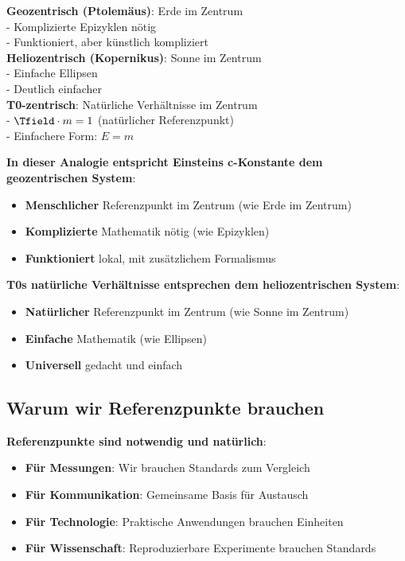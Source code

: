 	\begin{tcolorbox}[colback=blue!5!white,colframe=blue!75!black,title=Der Referenzpunktwechsel: Von Erde $\rightarrow$ Sonne $\rightarrow$ Natur]
		\textbf{Geozentrisch (Ptolemäus)}: Erde im Zentrum \\
		- Komplizierte Epizyklen nötig \\
		- Funktioniert, aber künstlich kompliziert \\
		
		\textbf{Heliozentrisch (Kopernikus)}: Sonne im Zentrum \\
		- Einfache Ellipsen \\
		- Deutlich einfacher \\
		
		\textbf{T0-zentrisch}: Natürliche Verhältnisse im Zentrum \\
		- $\Tfield \cdot m = 1$ (natürlicher Referenzpunkt) \\
		- Einfachere Form: $E = m$
	\end{tcolorbox}
	
	\textbf{In dieser Analogie entspricht Einsteins c-Konstante dem geozentrischen System}:
	\begin{itemize}
		\item \textbf{Menschlicher} Referenzpunkt im Zentrum (wie Erde im Zentrum)
		\item \textbf{Komplizierte} Mathematik nötig (wie Epizyklen)
		\item \textbf{Funktioniert} lokal, mit zusätzlichem Formalismus
	\end{itemize}
	
	\textbf{T0s natürliche Verhältnisse entsprechen dem heliozentrischen System}:
	\begin{itemize}
		\item \textbf{Natürlicher} Referenzpunkt im Zentrum (wie Sonne im Zentrum)
		\item \textbf{Einfache} Mathematik (wie Ellipsen)
		\item \textbf{Universell} gedacht und einfach
	\end{itemize}
	
	\subsection{Warum wir Referenzpunkte brauchen}
	
	\textbf{Referenzpunkte sind notwendig und natürlich}:
	\begin{itemize}
		\item \textbf{Für Messungen}: Wir brauchen Standards zum Vergleich
		\item \textbf{Für Kommunikation}: Gemeinsame Basis für Austausch
		\item \textbf{Für Technologie}: Praktische Anwendungen brauchen Einheiten
		\item \textbf{Für Wissenschaft}: Reproduzierbare Experimente brauchen Standards
	\end{itemize}
	
